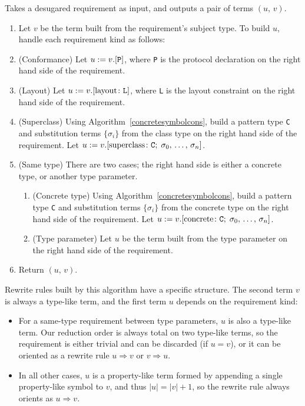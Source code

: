 \documentclass[../generics]{subfiles}
\begin{document}
\begin{algorithm}\label{build rule}
Takes a desugared requirement as input, and outputs a pair of terms $(u,\,v)$.
\begin{enumerate}
\item Let $v$ be the term built from the requirement's subject type. To build $u$, handle each requirement kind as follows:
%
\item (Conformance) Let $u := v.[\texttt{P}]$, where \texttt{P} is the protocol declaration on the right hand side of the requirement.
%
\item (Layout) Let $u := v.[\mathrm{layout}\colon\texttt{L}]$, where \texttt{L} is the layout constraint on the right hand side of the requirement.
%
\item (Superclass) Using Algorithm~\ref{concretesymbolcons}, build a pattern type \texttt{C} and substitution terms $\{\sigma_i\}$ from the class type on the right hand side of the requirement. Let $u := v.[\mathrm{superclass}\colon \texttt{C};\;\sigma_0,\,\ldots,\,\sigma_n]$.
%
\item (Same type) There are two cases; the right hand side is either a concrete type, or another type parameter.
\begin{enumerate}
\item (Concrete type) Using Algorithm~\ref{concretesymbolcons}, build a pattern type \texttt{C} and substitution terms $\{\sigma_i\}$ from the concrete type on the right hand side of the requirement. Let $u := v.[\mathrm{concrete}\colon \texttt{C};\;\sigma_0,\,\ldots,\,\sigma_n]$.
\item (Type parameter) Let $u$ be the term built from the type parameter on the right hand side of the requirement.
\end{enumerate}
\item Return $(u,\,v)$.
\end{enumerate}
\end{algorithm}
Rewrite rules built by this algorithm have a specific structure. The second term $v$ is always a type-like term, and the first term $u$ depends on the requirement kind:
\begin{itemize}
\item For a same-type requirement between type parameters, $u$ is also a type-like term. Our reduction order is always total on two type-like terms, so the requirement is either trivial and can be discarded (if $u=v$), or it can be oriented as a rewrite rule $u\Rightarrow v$ or $v\Rightarrow u$.
\item In all other cases, $u$ is a property-like term formed by appending a single property-like symbol to $v$, and thus $|u|=|v|+1$, so the rewrite rule always orients as $u\Rightarrow v$.
\end{itemize}
\end{document}
